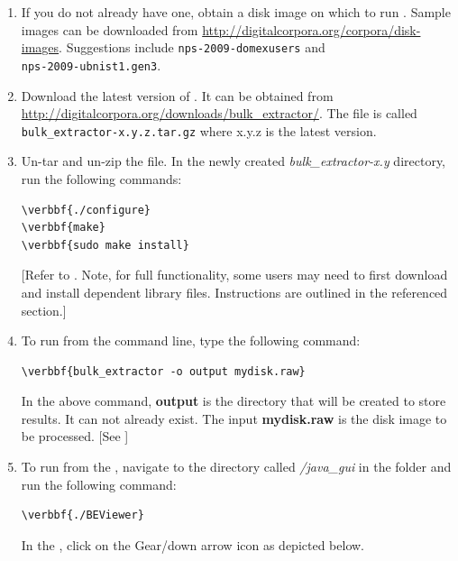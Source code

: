 \documentclass[11pt]{article} %
\begin{document}
\begin{enumerate}
\item If you do not already have one, obtain a disk image on which to run \bulk. Sample images can be downloaded from \url{http://digitalcorpora.org/corpora/disk-images}. Suggestions include \texttt{nps-2009-domexusers} and \\ \texttt{nps-2009-ubnist1.gen3}.
\item Download the latest version of \bulk. It can be obtained from \url{http://digitalcorpora.org/downloads/bulk_extractor/}. The file is called \texttt{bulk\_extractor-x.y.z.tar.gz} where x.y.z is the latest version. 

\item Un-tar and un-zip the file.  In the newly created \textit{bulk\_extractor-x.y} directory, run the following commands:

\begin{Verbatim}[commandchars=\\\{\}]
\verbbf{./configure}
\verbbf{make}
\verbbf{sudo make install}
\end{Verbatim}
[Refer to \textbf{} \textbf{}. Note, for full functionality, some users may need to first download and install dependent library files. Instructions are outlined in the referenced section.]

\item To run \bulk from the command line, type the following command:
\begin{Verbatim}[commandchars=\\\{\}]
\verbbf{bulk_extractor -o output mydisk.raw}
\end{Verbatim} 

In the above command, \textbf{output} is the directory that will be created to store \bulk results.  It can not already exist. The input \textbf{mydisk.raw} is the disk image to be processed.
[See  \textbf{} \textbf{}]

\item To run \bulk from the \viewer, navigate to the directory called \textit{/java\_gui} in the \bulk folder and run the following command:
\begin{Verbatim}[commandchars=\\\{\}]
\verbbf{./BEViewer}
\end{Verbatim}

In the \viewer, click on the Gear/down arrow icon as depicted below.
 

\end{enumerate}
\end{document}
